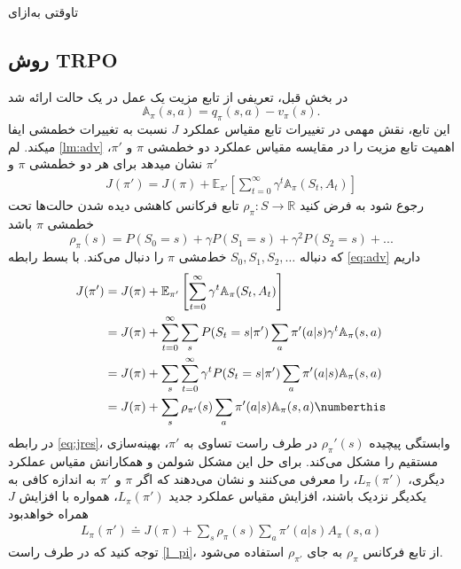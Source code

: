

‌تاوقتی
‌به‌ازای
\subsection{روش TRPO}
در بخش قبل، تعریفی از تابع مزیت یک عمل در یک حالت ارائه شد
$$\mathbb{A}_\pi(s,a) = q_\pi(s,a) - v_\pi(s).$$
این تابع، نقش مهمی در تغییرات تابع مقیاس عملکرد $J$ نسبت به تغییرات خط\nf مشی ایفا می\nf کند. لم 
\ref{lm:adv}
اهمیت تابع مزیت را در مقایسه مقیاس عملکرد دو خط\nf مشی $\pi$ و $\pi'$، نشان می\nf دهد
برای هر دو خط\nf مشی $\pi$ و $\pi'$
\begin{align}
J(\pi') = J(\pi) + \mathbb{E}_{\pi'}\left[\sum_{t=0}^{\infty} \gamma^t \mathbb{A}_\pi(S_t, A_t)\right]
\label{eq:adv}
\end{align}
\label{lm:adv}
رجوع شود به 
\cite{degris2012off}
فرض کنید
$\rho_\pi : S \longrightarrow \mathbb{R}$
تابع فرکانس کاهشی دیده شدن حالت‌ها تحت خط\nf مشی $\pi$ باشد 
$$\rho_\pi(s) = P(S_0=s) + \gamma P(S_1=s) + \gamma^2 P(S_2=s) + ...$$
که دنباله 
$S_0, S_1, S_2, \dots$
 خط‌مشی $\pi$ را دنبال می‌کند.
با بسط رابطه
\ref{eq:adv}
داریم
\begin{align}
J(\pi')  & = J(\pi) + \mathbb{E}_{\pi'}\left[\sum_{t=0}^{\infty} \gamma^t \mathbb{A}_\pi(S_t, A_t)\right] \\
& = J(\pi) + \sum_{t=0}^{\infty} \sum_{s} P(S_t = s| \pi') \sum_{a} \pi'(a|s) \gamma^t \mathbb{A}_\pi(s,a) \\
& = J(\pi) + \sum_{s} \sum_{t=0}^{\infty} \gamma^t P(S_t = s | \pi') \sum_{a} \pi'(a|s) \mathbb{A}_\pi(s,a) \\
& = J(\pi) + \sum_{s} \rho_{\pi'}(s) \sum_{a} \pi'(a|s) \mathbb{A}_\pi(s,a) \numberthis
\label{eq:jres}
\end{align}
در رابطه 
\ref{eq:jres}،
وابستگی پیچیده  $\rho_\pi'(s)$ در طرف راست تساوی به $\pi'$، بهینه‌سازی مستقیم را مشکل می‌کند.
برای حل این مشکل شولمن و همکارانش 
\cite{schulman2015trust}
مقیاس عملکرد دیگری، $L_\pi(\pi')$، را معرفی می‌کنند و نشان می‌دهند که اگر $\pi$ و $\pi'$ به اندازه کافی به یکدیگر نزدیک باشند، افزایش مقیاس عملکرد جدید $L_\pi(\pi')$، همواره با افزایش $J$ همراه خواهد‌بود
\begin{align}
	L_\pi(\pi') \doteq J(\pi) + \sum_{s} \rho_{\pi}(s) \sum_{a} \pi'(a|s) A_\pi(s,a)
	\label{l_pi}
\end{align}
توجه کنید که در طرف راست 
\ref{l_pi}،
 از تابع فرکانس $\rho_\pi$ به جای 
 $\rho_{\pi'}$
استفاده می‌شود.

